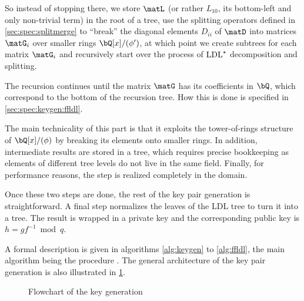 \begin{itemize}
 So instead of stopping there, we store $\matL$ (or rather $L_{10}$, its bottom-left and only non-trivial term) in the root of a tree, use the splitting operators defined in \cref{sec:spec:splitmerge} to ``break'' the diagonal elements $D_{ii}$ of $\matD$ into matrices $\matG_i$ over smaller rings $\bQ[x]/(\phi')$, at which point we create subtrees for each matrix $\matG_i$ and recursively start over the process of $ \text{LDL}^\star $ decomposition and splitting.

 The recursion continues until the matrix $\matG$ has its coefficients in $\bQ$, which correspond to the bottom of the recursion tree. How this is done is specified in \cref{sec:spec:keygen:ffldl}.

 The main technicality of this part is that it exploits the tower-of-rings structure of $\bQ[x]/(\phi)$ by breaking its elements onto smaller rings. In addition, intermediate results are stored in a tree, which requires precise bookkeeping as elements of different tree levels do not live in the same field. Finally, for performance reasons, the step is realized completely in the \fft domain.
\end{itemize}

Once these two steps are done, the rest of the key pair generation is straightforward. A final step normalizes the leaves of the LDL tree to turn it into a \falcon tree. The result is wrapped in a private key \sk and the corresponding public key \pk is $h = g f^{-1} \bmod q$.


A formal description is given in algorithms \ref{alg:keygen} to \ref{alg:ffldl}, the main algorithm being the procedure \longkeygen. The general architecture of the key pair generation is also illustrated in \cref{fig:keygen}.

\begin{figure}[t]
\centering
{}
\caption{Flowchart of the key generation}\label{fig:keygen}
\end{figure}



